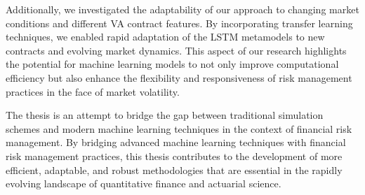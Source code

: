 Additionally, we investigated the adaptability of our approach to changing market conditions and different VA contract features. 
By incorporating transfer learning techniques, we enabled rapid adaptation of the LSTM metamodels to new contracts and evolving market dynamics. 
This aspect of our research highlights the potential for machine learning models to not only improve computational efficiency but also enhance the flexibility and responsiveness of risk management practices in the face of market volatility.

The thesis is an attempt to bridge the gap between traditional simulation schemes and modern machine learning techniques in the context of financial risk management.
By bridging advanced machine learning techniques with financial risk management practices, this thesis contributes to the development of more efficient, adaptable, and robust methodologies that are essential in the rapidly evolving landscape of quantitative finance and actuarial science.

